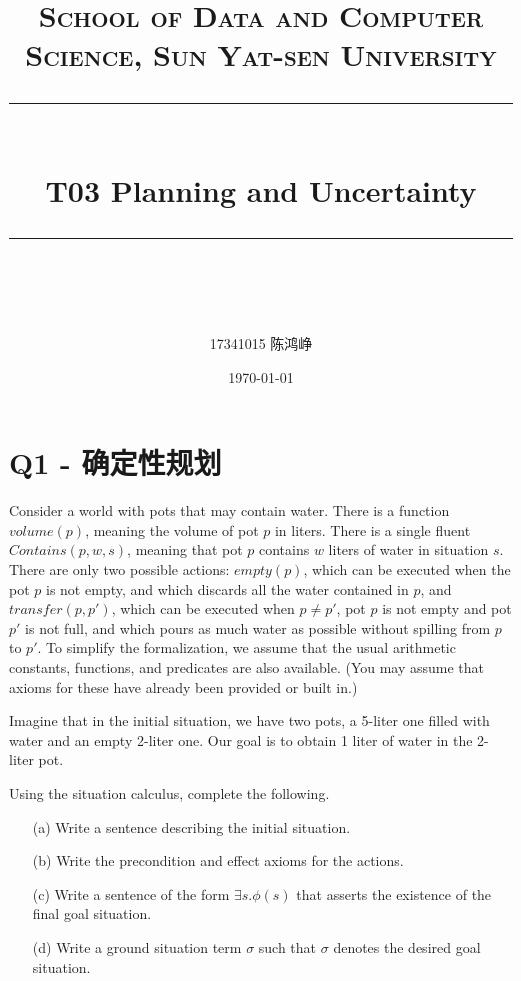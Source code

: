 \documentclass[a4paper, 11pt]{article}
\title{
\normalfont \normalsize
\textsc{School of Data and Computer Science, Sun Yat-sen University} \\ [25pt] %
\rule{\textwidth}{0.5pt} \\[0.4cm] %
\huge  T03 Planning and Uncertainty\\ %
\rule{\textwidth}{2pt} \\[0.5cm] %
\author{17341015 陈鸿峥}
\date{\normalsize\today}
}
\begin{document}
\maketitle
\tableofcontents
\newpage

\begin{flushleft}
\end{flushleft}

\section{Q1 - 确定性规划}
\begin{question}\normalfont
Consider a world with pots that may contain water. There is a function $volume(p)$, meaning the volume of pot $p$ in liters. There is a single fluent $Contains(p, w, s)$, meaning that pot $p$ contains $w$ liters of water in situation $s$. There are only two possible actions: $empty(p)$, which can be executed when the pot $p$ is not empty, and which discards all the water contained in $p$, and $transfer(p, p')$, which can be executed when $p \ne p'$, pot $p$ is not empty and pot $p'$ is not full, and which pours as much water as possible without spilling from $p$ to $p'$. To simplify the formalization, we assume that the usual arithmetic constants, functions, and predicates are also available. (You may assume that axioms for these have already been provided or built in.)

Imagine that in the initial situation, we have two pots, a 5-liter one filled with water and an empty 2-liter one. Our goal is to obtain 1 liter of water in the 2-liter pot.

Using the situation calculus, complete the following.
\begin{itemize}
    \item [(a)] Write a sentence describing the initial situation.
    \item [(b)] Write the precondition and effect axioms for the actions.
    \item [(c)] Write a sentence of the form $\exists s.\phi(s)$ that asserts the existence of the final goal situation.
    \item [(d)] Write a ground situation term $\sigma$ such that $\sigma$ denotes the desired goal situation.
\end{itemize}
\end{question}
\end{document}
